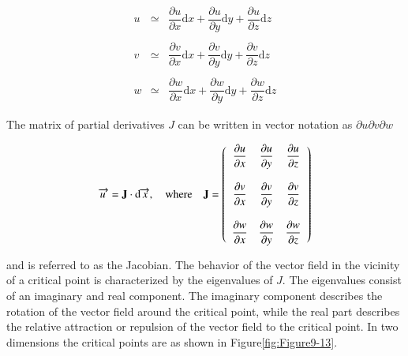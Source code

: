 \begin{equation}\label{eq:9.10}
\begin{array}{lll}
u &\simeq& \dfrac{\partial u}{\partial x}\text{d}x
         + \dfrac{\partial u}{\partial y}\text{d}y
         + \dfrac{\partial u}{\partial z}\text{d}z \\ \\
v &\simeq& \dfrac{\partial v}{\partial x}\text{d}x
         + \dfrac{\partial v}{\partial y}\text{d}y
         + \dfrac{\partial v}{\partial z}\text{d}z \\ \\
w &\simeq& \dfrac{\partial w}{\partial x}\text{d}x
         + \dfrac{\partial w}{\partial y}\text{d}y
         + \dfrac{\partial w}{\partial z}\text{d}z
\end{array}
\end{equation}

The matrix of partial derivatives $J$ can be written in vector notation as $\partial u \partial v \partial w$

\begin{equation}\label{eq:9.11}
\overrightarrow{u\ } = \mathbf{J}\cdot\text{d}\overrightarrow{x },\quad \text{where} \quad \mathbf{J} = \left(
\begin{array}{c c c}
\dfrac{\partial u}{\partial x} & \dfrac{\partial u}{\partial y} & \dfrac{\partial u}{\partial z} \\ \\
\dfrac{\partial v}{\partial x} & \dfrac{\partial v}{\partial y} & \dfrac{\partial v}{\partial z} \\ \\
\dfrac{\partial w}{\partial x} & \dfrac{\partial w}{\partial y} & \dfrac{\partial w}{\partial z}
\end{array}
\right)
\end{equation}

and is referred to as the Jacobian. The behavior of the vector field in the vicinity of a critical point is characterized by the eigenvalues of $J$. The eigenvalues consist of an imaginary and real component. The imaginary component describes the rotation of the vector field around the critical point, while the real part describes the relative attraction or repulsion of the vector field to the critical point. In two dimensions the critical points are as shown in Figure\ref{fig:Figure9-13}.

